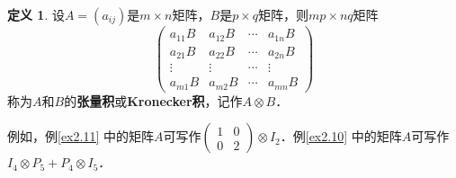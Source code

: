 \documentclass[a4paper,fontset=windows]{ctexbook}
\theoremstyle{definition}
\newtheorem{definition}{定义}[chapter]
\begin{document}
\begin{definition}
设$A=(a_{ij})$是$m\times n$矩阵，$B$是$p\times q$矩阵，则$mp\times nq$矩阵
$$\begin{pmatrix}a_{11}B&a_{12}B&\cdots&a_{1n}B \\ a_{21}B&a_{22}B&\cdots&a_{2n}B \\ \vdots&\vdots&\cdots&\vdots \\ a_{m1}B&a_{m2}B&\cdots&a_{mn}B\end{pmatrix}$$
称为$A$和$B$的{\bf 张量积}或{\bf Kronecker积}，记作$A\otimes B$．
\end{definition}

例如，例\ref{ex2.11} 中的矩阵$A$可写作$\begin{pmatrix}1&0 \\ 0&2\end{pmatrix}\otimes I_2$．例\ref{ex2.10} 中的矩阵$A$可写作$I_4\otimes P_5+P_4\otimes I_5$．
\end{document}
